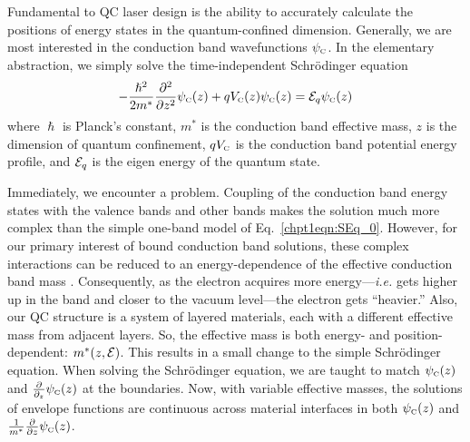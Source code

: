\documentclass[12pt]{report}
\begin{document}
Fundamental to QC laser design is the ability to accurately calculate the positions of energy states in the quantum-confined dimension.  Generally, we are most interested in the conduction band wavefunctions $\psi_{\textnormal{\tiny{C}}}$.  In the elementary abstraction, we simply solve the time-independent Schr\"{o}dinger equation
\begin{equation}
\label{chpt1eqn:SEq_0}
-\frac{\hslash^2}{2m^*} \frac{\partial^2}{\partial z^2}\psi_\tn{\tiny{C}}(z) + q V_\tn{\tiny{C}}(z) \psi_\tn{\tiny{C}}(z) = \EE_q \psi_\tn{\tiny{C}}(z)
\end{equation}
where $\hslash$ is Planck's constant, $m^*$ is the conduction band effective mass, $z$ is the dimension of quantum confinement, $q V_{\textnormal{\tiny{C}}}$ is the conduction band potential energy profile, and $\EE_q$ is the eigen energy of the quantum state.

Immediately, we encounter a problem.  Coupling of the conduction band energy states with the valence bands and other bands makes the solution much more complex than the simple one-band model of Eq.~\eqref{chpt1eqn:SEq_0}.  However, for our primary interest of bound conduction band solutions, these complex interactions can be reduced to an energy-dependence of the effective conduction band mass \cite{Sirtori:PRB:1994}.  Consequently, as the electron acquires more energy---\emph{i.e.} gets higher up in the band and closer to the vacuum level---the electron gets ``heavier.''  Also, our QC structure is a system of layered materials, each with a different effective mass from adjacent layers.  So, the effective mass is both energy- and position-dependent: $m^*(z,\EE)$.  This results in a small change to the simple Schr\"{o}dinger equation.  When solving the Schr\"{o}dinger equation, we are taught to match $\psi_{\textnormal{\tiny{C}}}(z)$ and $\frac{\partial}{\partial_z} \psi_{\textnormal{\tiny{C}}}(z)$ at the boundaries.  Now, with variable effective masses, the solutions of envelope functions \cite{Harrison} are continuous across material interfaces in both $\psi_{\textnormal{\tiny{C}}}(z)$ and $\frac{1}{m^*} \frac{\partial}{\partial z} \psi_{\textnormal{\tiny{C}}}(z)$.
\end{document}

